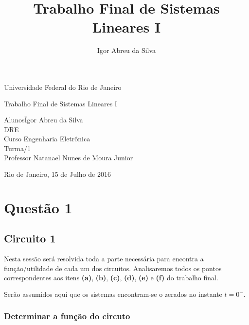 \documentclass[a4paper, 12pt]{article}
\author{Igor Abreu da Silva}
\title{Trabalho Final de Sistemas Lineares I}
\begin{document}
	
	\begin{titlepage}
		\begin{center}
			\huge{Universidade Federal do Rio de Janeiro}
			\vspace{95pt}

			\large{Trabalho Final de Sistemas Lineares I}
			\vspace{160pt}
		\end{center}
		
		\begin{flushleft}
			\begin{tabbing}
				Alunos\qquad\qquad\= Igor Abreu da Silva\\
				DRE \\
				Curso\> Engenharia Eletrônica \\
				Turma/1 \\
				Professor\> Natanael Nunes de Moura Junior \\
			
			\end{tabbing}
			
		\end{flushleft}
		
		\begin{center}
			\vspace{\fill}
			Rio de Janeiro, 15 de Julho de 2016
		\end{center}
	\end{titlepage}


	\newpage
	\tableofcontents
	\listoffigures
	\thispagestyle{empty}
	
	\newpage
	
	\section{Quest\~{a}o 1}
		\subsection{Circuito 1}
			Nesta sessão será resolvida toda a parte necessária para encontra a função/utilidade de cada um dos circuitos. Analisaremos todos os pontos correspondentes aos itens \textbf{(a)}, \textbf{(b)}, \textbf{(c)}, \textbf{(d)}, \textbf{(e)} e \textbf{(f)} do trabalho final. 
			
			
			Serão assumidos aqui que os sistemas encontram-se o zerados no instante $t = 0^{-}$.
			\subsubsection{Determinar a função do circuto}
			
\end{document}
